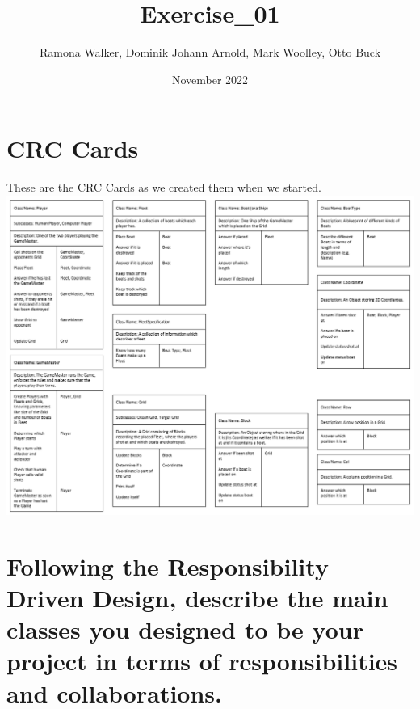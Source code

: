 \documentclass{article}
\title{Exercise\_01}
\author{Ramona Walker, Dominik Johann Arnold, Mark Woolley, Otto Buck}
\date{November 2022}
\begin{document}
\maketitle

\section{CRC Cards}
These are the CRC Cards as we created them when we started. \\
\includegraphics[width = \linewidth]{images/CRC cards.png}
\newpage




\section{Following the Responsibility Driven Design, describe the main classes you designed to be your project in terms of responsibilities and collaborations.}
\end{document}
